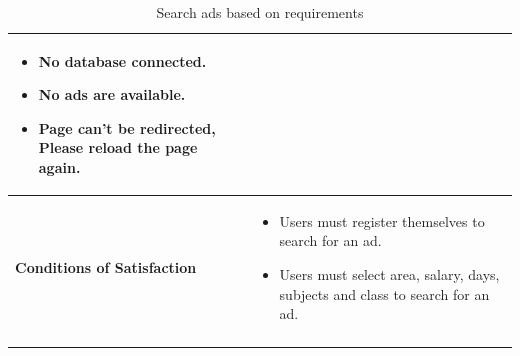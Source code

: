 \begin{center}
\begin{longtable}{|m{70pt}|p{9cm}|}
\begin{itemize}
                            \item No database connected.
                            \item No ads are available.
                            \item Page can't be redirected, Please reload the page again. 
                        \end{itemize}\\
            \hline
                \textbf{Conditions of Satisfaction} &  
                    \begin{itemize}
                        \item  Users must register themselves to search for an ad.
                        \item Users must select  area, salary, days, subjects and class to search for an ad.
                    \end{itemize}\\
            \hline
        \caption{Search ads based on requirements}
        \label{tab:my_label}
        \end{longtable}
\end{center}


